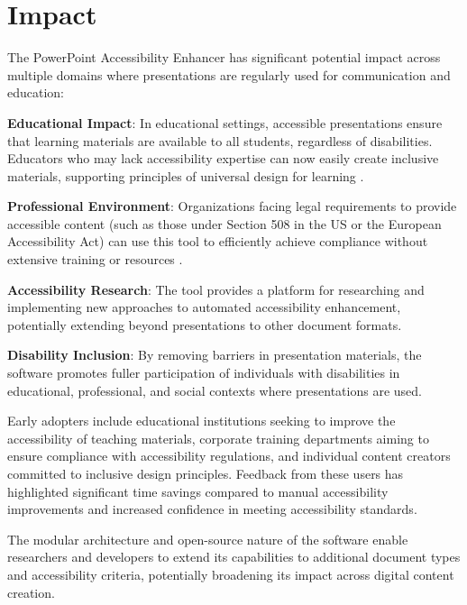 \documentclass[preprint,review,12pt]{elsarticle} %
\begin{document}
\section{Impact}
The PowerPoint Accessibility Enhancer has significant potential impact across multiple domains where presentations are regularly used for communication and education:

\textbf{Educational Impact}: In educational settings, accessible presentations ensure that learning materials are available to all students, regardless of disabilities. Educators who may lack accessibility expertise can now easily create inclusive materials, supporting principles of universal design for learning \cite{udl}.

\textbf{Professional Environment}: Organizations facing legal requirements to provide accessible content (such as those under Section 508 in the US or the European Accessibility Act) can use this tool to efficiently achieve compliance without extensive training or resources \cite{section508}.

\textbf{Accessibility Research}: The tool provides a platform for researching and implementing new approaches to automated accessibility enhancement, potentially extending beyond presentations to other document formats.

\textbf{Disability Inclusion}: By removing barriers in presentation materials, the software promotes fuller participation of individuals with disabilities in educational, professional, and social contexts where presentations are used.

Early adopters include educational institutions seeking to improve the accessibility of teaching materials, corporate training departments aiming to ensure compliance with accessibility regulations, and individual content creators committed to inclusive design principles. Feedback from these users has highlighted significant time savings compared to manual accessibility improvements and increased confidence in meeting accessibility standards.

The modular architecture and open-source nature of the software enable researchers and developers to extend its capabilities to additional document types and accessibility criteria, potentially broadening its impact across digital content creation.

\end{document}
